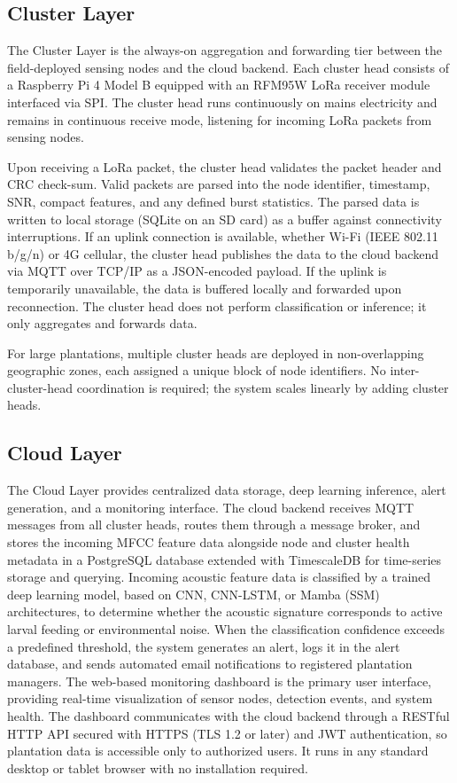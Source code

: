 \documentclass[12pt,a4paper,oneside]{memoir}
\newcommand{\newrevision}[1]{\textcolor{green!45!black}{#1}}
\begin{document}
\subsection{Cluster Layer}

The Cluster Layer is the always-on aggregation and forwarding tier between the field-deployed sensing nodes and the cloud backend. Each cluster head consists of a Raspberry Pi 4 Model B equipped with an RFM95W LoRa receiver module interfaced via SPI. The cluster head runs continuously on mains electricity and remains in continuous receive mode, listening for incoming LoRa packets from sensing nodes.

Upon receiving a LoRa packet, the cluster head validates the packet header and CRC check-sum. \newrevision{Valid packets are parsed into the node identifier, timestamp, SNR, compact features, and any defined burst statistics.} The parsed data is written to local storage (SQLite on an SD card) as a buffer against connectivity interruptions. If an uplink connection is available, whether Wi-Fi (IEEE 802.11 b/g/n) or 4G cellular, the cluster head publishes the data to the cloud backend via MQTT over TCP/IP as a JSON-encoded payload. If the uplink is temporarily unavailable, the data is buffered locally and forwarded upon reconnection. The cluster head does not perform classification or inference; it only aggregates and forwards data.

For large plantations, multiple cluster heads are deployed in non-overlapping geographic zones, each assigned a unique block of node identifiers. No inter-cluster-head coordination is required; the system scales linearly by adding cluster heads.


\subsection{Cloud Layer}

The Cloud Layer provides centralized data storage, deep learning inference, alert generation, and a monitoring interface. The cloud backend receives MQTT messages from all cluster heads, routes them through a message broker, and stores the incoming MFCC feature data alongside node and cluster health metadata in a PostgreSQL database extended with TimescaleDB for time-series storage and querying. Incoming acoustic feature data is classified by a trained deep learning model, based on CNN, CNN-LSTM, or Mamba (SSM) architectures, to determine whether the acoustic signature corresponds to active larval feeding or environmental noise. When the classification confidence exceeds a predefined threshold, the system generates an alert, logs it in the alert database, and sends automated email notifications to registered plantation managers. The web-based monitoring dashboard is the primary user interface, providing real-time visualization of sensor nodes, detection events, and system health. The dashboard communicates with the cloud backend through a RESTful HTTP API secured with HTTPS (TLS 1.2 or later) and JWT authentication, so plantation data is accessible only to authorized users. It runs in any standard desktop or tablet browser with no installation required.
\end{document}

